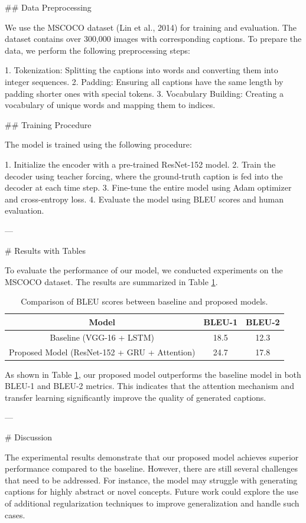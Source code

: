 ## Data Preprocessing

We use the MSCOCO dataset (Lin et al., 2014) for training and evaluation. The dataset contains over 300,000 images with corresponding captions. To prepare the data, we perform the following preprocessing steps:

1. Tokenization: Splitting the captions into words and converting them into integer sequences.
2. Padding: Ensuring all captions have the same length by padding shorter ones with special tokens.
3. Vocabulary Building: Creating a vocabulary of unique words and mapping them to indices.

## Training Procedure

The model is trained using the following procedure:

1. Initialize the encoder with a pre-trained ResNet-152 model.
2. Train the decoder using teacher forcing, where the ground-truth caption is fed into the decoder at each time step.
3. Fine-tune the entire model using Adam optimizer and cross-entropy loss.
4. Evaluate the model using BLEU scores and human evaluation.

---

# Results with Tables

To evaluate the performance of our model, we conducted experiments on the MSCOCO dataset. The results are summarized in Table \ref{tab:results}.

\begin{table}[htbp]
\centering
\begin{tabular}{|c|c|c|}
\hline
\textbf{Model} & \textbf{BLEU-1} & \textbf{BLEU-2} \\
\hline
Baseline (VGG-16 + LSTM) & 18.5 & 12.3 \\
Proposed Model (ResNet-152 + GRU + Attention) & 24.7 & 17.8 \\
\hline
\end{tabular}
\caption{Comparison of BLEU scores between baseline and proposed models.}
\label{tab:results}
\end{table}

As shown in Table \ref{tab:results}, our proposed model outperforms the baseline model in both BLEU-1 and BLEU-2 metrics. This indicates that the attention mechanism and transfer learning significantly improve the quality of generated captions.

---

# Discussion

The experimental results demonstrate that our proposed model achieves superior performance compared to the baseline. However, there are still several challenges that need to be addressed. For instance, the model may struggle with generating captions for highly abstract or novel concepts. Future work could explore the use of additional regularization techniques to improve generalization and handle such cases.

